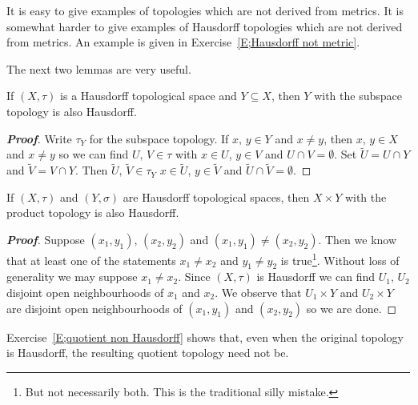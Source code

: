 It is easy to give examples of topologies which are not
derived from metrics. It is somewhat harder to give examples
of Hausdorff topologies which are not derived from metrics.
An example is given in Exercise~\ref{E;Hausdorff not metric}.

The next two lemmas are very useful.

\begin{lemma}\label{L;inherit Hausdoff subspace}
If $(X,\tau)$ is a Hausdorff topological space
and $Y\subseteq X$, then $Y$ with the subspace topology
is also Hausdorff.
\end{lemma}
\begin{proof}[\bf Proof] Write $\tau_{Y}$ for the subspace topology.
If $x,\,y\in Y$ and $x\neq y$, then $x,\,y\in X$ and $x\neq y$ so we can find $U,\,V\in\tau$ with $x\in U$, $y\in V$ and $U\cap V=\emptyset$. Set $\tilde{U}=U\cap Y$ and $\tilde{V}=V\cap Y$. Then $\tilde{U},\,\tilde{V}\in\tau_{Y}$ $x\in \tilde{U}$, $y\in \tilde{V}$ and $\tilde{U}\cap\tilde{V}=\emptyset$.
\end{proof}



\begin{lemma}\label{L;inherit Hausdoff product}
If $(X,\tau)$ and $(Y,\sigma)$ are Hausdorff topological spaces,
then $X\times Y$ with the product topology
is also Hausdorff.
\end{lemma}
\begin{proof}[\bf Proof] Suppose $(x_{1},y_{1}),\,(x_{2},y_{2})$
and $(x_{1},y_{1})\neq(x_{2},y_{2})$. Then we know that at least
one of the statements $x_{1}\neq x_{2}$ and $y_{1}\neq y_{2}$
is true\footnote{But not necessarily both. This is the traditional
silly mistake.}. Without loss of generality we may suppose
$x_{1}\neq x_{2}$. Since $(X,\tau)$ is Hausdorff we can find
$U_{1},\,U_{2}$ disjoint open neighbourhoods of $x_{1}$ and $x_{2}$.
We observe that  $U_{1}\times Y$ and $U_{2}\times Y$
are disjoint open neighbourhoods of $(x_{1},y_{1})$
and $(x_{2},y_{2})$ so we are done.
\end{proof}


Exercise~\ref{E;quotient non Hausdorff} shows that, even when
the original topology is Hausdorff, the resulting quotient
topology need not be.
















